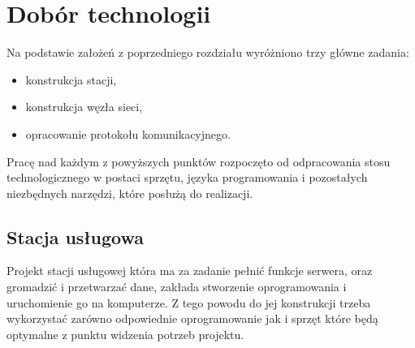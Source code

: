 \documentclass[12pt, twoside, openany]{mwrep}
\begin{document}
\chapter{Dobór technologii}

Na podstawie założeń z poprzedniego rozdziału wyróżniono trzy główne zadania:
\begin{itemize}
\item konstrukcja stacji,
\item	konstrukcja węzła sieci,
\item	opracowanie protokołu komunikacyjnego. 
\end{itemize}
Pracę nad każdym z powyższych punktów rozpoczęto od odpracowania stosu technologicznego w postaci sprzętu, języka programowania i pozostałych niezbędnych narzędzi, które posłużą do realizacji.

\section{Stacja usługowa}

Projekt stacji usługowej która ma za zadanie pełnić funkcje serwera, oraz gromadzić i przetwarzać dane, zakłada stworzenie oprogramowania i uruchomienie go na komputerze.  Z tego powodu do jej konstrukcji trzeba wykorzystać zarówno odpowiednie oprogramowanie jak i sprzęt które będą optymalne z punktu widzenia potrzeb projektu. 

\end{document}
